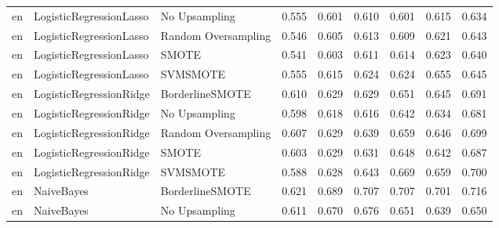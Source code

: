 \begin{tabular}{lllllllll}
      en &      LogisticRegressionLasso &       No Upsampling & 0.555 &                     0.601 &                 0.610 &                  0.601 &                                   0.615 &     0.634 \\
      en &      LogisticRegressionLasso & Random Oversampling & 0.546 &                     0.605 &                 0.613 &                  0.609 &                                   0.621 &     0.643 \\
      en &      LogisticRegressionLasso &               SMOTE & 0.541 &                     0.603 &                 0.611 &                  0.614 &                                   0.623 &     0.640 \\
      en &      LogisticRegressionLasso &            SVMSMOTE & 0.555 &                     0.615 &                 0.624 &                  0.624 &                                   0.655 &     0.645 \\
      en &      LogisticRegressionRidge &     BorderlineSMOTE & 0.610 &                     0.629 &                 0.629 &                  0.651 &                                   0.645 &     0.691 \\
      en &      LogisticRegressionRidge &       No Upsampling & 0.598 &                     0.618 &                 0.616 &                  0.642 &                                   0.634 &     0.681 \\
      en &      LogisticRegressionRidge & Random Oversampling & 0.607 &                     0.629 &                 0.639 &                  0.659 &                                   0.646 &     0.699 \\
      en &      LogisticRegressionRidge &               SMOTE & 0.603 &                     0.629 &                 0.631 &                  0.648 &                                   0.642 &     0.687 \\
      en &      LogisticRegressionRidge &            SVMSMOTE & 0.588 &                     0.628 &                 0.643 &                  0.669 &                                   0.659 &     0.700 \\
      en &                   NaiveBayes &     BorderlineSMOTE & 0.621 &                     0.689 &                 0.707 &                  0.707 &                                   0.701 &     0.716 \\
      en &                   NaiveBayes &       No Upsampling & 0.611 &                     0.670 &                 0.676 &                  0.651 &                                   0.639 &     0.650 \\

\end{tabular}

